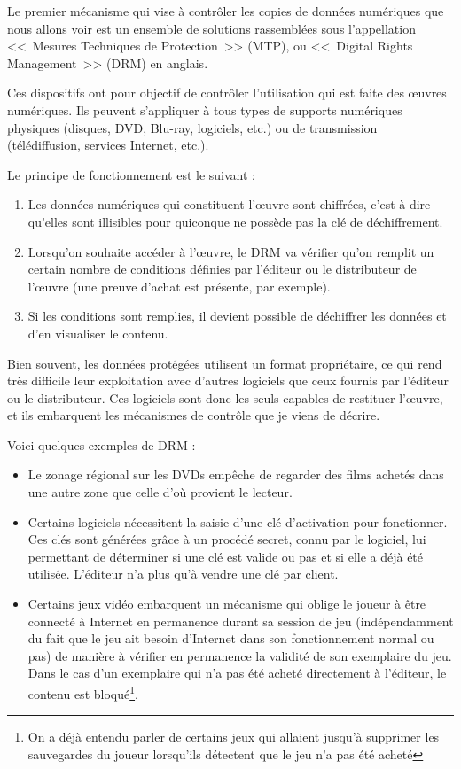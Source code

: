 Le premier mécanisme qui vise à contrôler les copies de données numériques que nous allons voir est un ensemble de solutions rassemblées sous l'appellation <<~Mesures Techniques de Protection~>> (MTP), ou <<~Digital Rights Management~>> (DRM) en anglais.

Ces dispositifs ont pour objectif de contrôler l'utilisation qui est faite des œuvres numériques.
Ils peuvent s'appliquer à tous types de supports numériques physiques (disques, DVD, Blu-ray, logiciels, etc.) ou de transmission (télédiffusion, services Internet, etc.).

Le principe de fonctionnement est le suivant :

\begin{enumerate}
\item Les données numériques qui constituent l'œuvre sont chiffrées, c'est à dire qu'elles sont illisibles pour quiconque ne possède pas la clé de déchiffrement.
\item Lorsqu'on souhaite accéder à l'œuvre, le DRM va vérifier qu'on remplit un certain nombre de conditions définies par l'éditeur ou le distributeur de l'œuvre (une preuve d'achat est présente, par exemple).
\item Si les conditions sont remplies, il devient possible de déchiffrer les données et d'en visualiser le contenu.
\end{enumerate}

Bien souvent, les données protégées utilisent un format propriétaire, ce qui rend très difficile leur exploitation avec d'autres logiciels que ceux fournis par l'éditeur ou le distributeur.
Ces logiciels sont donc les seuls capables de restituer l'œuvre, et ils embarquent les mécanismes de contrôle que je viens de décrire.

Voici quelques exemples de DRM :

\begin{itemize}
\item  Le zonage régional sur les DVDs empêche de regarder des films achetés dans une autre zone que celle d'où provient le lecteur.
\item Certains logiciels nécessitent la saisie d'une clé d'activation pour fonctionner.
Ces clés sont générées grâce à un procédé secret, connu par le logiciel, lui permettant de déterminer si une clé est valide ou pas et si elle a déjà été utilisée.
L'éditeur n'a plus qu'à vendre une clé par client.
\item Certains jeux vidéo embarquent un mécanisme qui oblige le joueur à être connecté à Internet en permanence durant sa session de jeu (indépendamment du fait que le jeu ait besoin d'Internet dans son fonctionnement normal ou pas) de manière à vérifier en permanence la validité de son exemplaire du jeu.
Dans le cas d'un exemplaire qui n'a pas été acheté directement à l'éditeur, le contenu est bloqué\footnote{On a déjà entendu parler de certains jeux qui allaient jusqu'à supprimer les sauvegardes du joueur lorsqu'ils détectent que le jeu n'a pas été acheté}.
\end{itemize}

